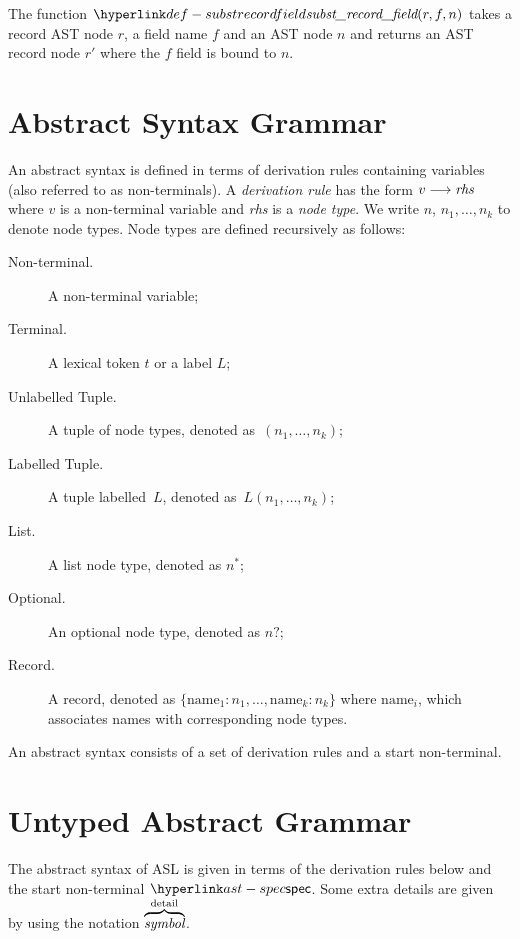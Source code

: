 \hypertarget{def-substrecordfield}{}
The function $\substrecordfield(r, f, n)$ takes a record AST node $r$, a field name $f$ and an AST node $n$
and returns an AST record node $r'$ where the $f$ field is bound to $n$.

\section{Abstract Syntax Grammar\label{sec:AbstractSyntaxGrammar}}

An abstract syntax is defined in terms of derivation rules containing variables (also referred to as non-terminals).
%
A \emph{derivation rule} has the form $v \longrightarrow \textit{rhs}$ where $v$ is a non-terminal variable and \textit{rhs} is a \emph{node type}. We write $n$, $n_1,\ldots,n_k$ to denote node types.
%
Node types are defined recursively as follows:
\begin{description}
\item[Non-terminal.] A non-terminal variable;
\item[Terminal.] A lexical token $t$ or a label $L$;
\item[Unlabelled Tuple.] A tuple of node types, denoted as~$(n_1,\ldots,n_k)$;
\item[Labelled Tuple.] A tuple labelled~$L$, denoted as~$L(n_1,\ldots,n_k)$;
\item[List.] A list node type, denoted as $n^{*}$;
\item[Optional.] An optional node type, denoted as $n?$;
\item[Record.] A record, denoted as $\{\text{name}_1 : n_1,\ldots,\text{name}_k : n_k\}$ where $\text{name}_i$, which associates names with corresponding node types.
\end{description}

\newpage

An abstract syntax consists of a set of derivation rules and a start non-terminal.

\newcommand\ASTComment[1]{//\quad\textit{#1}\ }

\section{Untyped Abstract Grammar\label{sec:UntypedAbstractGrammar}}

The abstract syntax of ASL is given in terms of the derivation rules below and the start non-terminal $\spec$.
%
Some extra details are given by using the notation $\overbrace{\textit{symbol}}^{\text{detail}}$.

